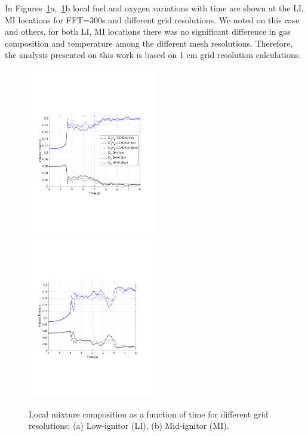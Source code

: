 \documentclass[12pt,letterpaper]{article}
\begin{document}
\begin{flushleft}
In Figures~\ref{fig:CompSetup}a,~\ref{fig:CompSetup}b local fuel and oxygen variations with time are shown at the LI, MI locations for FFT=300s and different grid resolutions. We noted on this case and others, for both LI, MI locations there was no significant difference in gas composition and temperature among the different mesh resolutions. Therefore, the analysis presented on this work is based on 1 cm grid resolution calculations.

\begin{figure}[tb]
    \centering
    \includegraphics[trim = 14.5mm 65mm 17mm 70mm, clip,width=0.505\textwidth]{AOSFST_Paper/Figures/Low_Ignitor_Comp_Tvar_300s.pdf}
    \includegraphics[trim = 22mm 65mm 17mm 70mm, clip,width=0.485\textwidth]{AOSFST_Paper/Figures/Mid_Ignitor_Comp_Tvar_300s.pdf}
     \\
    \caption{Local mixture composition as a function of time for different grid resolutions: (a) Low-ignitor (LI), (b) Mid-ignitor (MI). }
    \label{fig:CompSetup}
\end{figure}



\end{flushleft}
\end{document}
